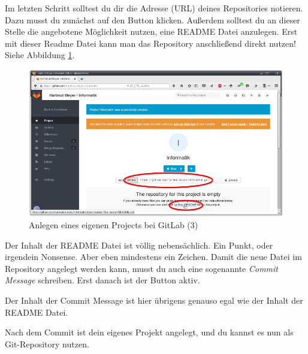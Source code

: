 Im letzten Schritt solltest du dir die Adresse (URL) deines Repositories
notieren. Dazu musst du zunächst auf den Button  klicken. Außerdem
solltest du an dieser Stelle die angebotene Möglichkeit nutzen, eine README
Datei anzulegen. Erst mit dieser Readme Datei kann man das Repository
anschließend direkt nutzen! Siehe Abbildung \ref{fig:gitlab-new-project-3}.

\begin{figure}[h]
  \centering
   \includegraphics[width=1.0\textwidth]{./inf/SEKII/01_Vorbereitung/GitLab_New_Project_3.png}
   \caption{Anlegen eines eigenen Projects bei GitLab (3)}
   \label{fig:gitlab-new-project-3}
\end{figure}

Der Inhalt der README Datei ist völlig nebensächlich. Ein Punkt, oder irgendein
Nonsense. Aber eben mindestens ein Zeichen. Damit die neue Datei im
Repository angelegt werden kann, musst du auch eine sogenannte \emph{Commit
Message} schreiben. Erst danach ist der Button  aktiv.

Der Inhalt der Commit Message ist hier übrigens genauso egal wie der Inhalt der
README Datei.

Nach dem Commit ist dein eigenes Projekt angelegt, und du kannst es nun als
Git-Repository nutzen.




\afterpage{\clearpage}


